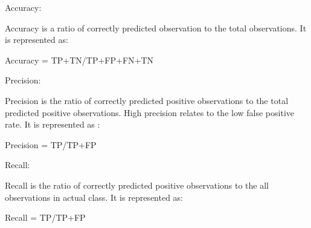 Accuracy: 

Accuracy is a ratio of correctly predicted observation to the total observations. It is represented as: 

Accuracy = TP+TN/TP+FP+FN+TN 

Precision: 

Precision is the ratio of correctly predicted positive observations to the total predicted positive observations. High precision relates to the low false positive rate. It is represented as : 

Precision = TP/TP+FP 

Recall: 

Recall is the ratio of correctly predicted positive observations to the all observations in actual class. It is represented as: 

Recall = TP/TP+FP 

 